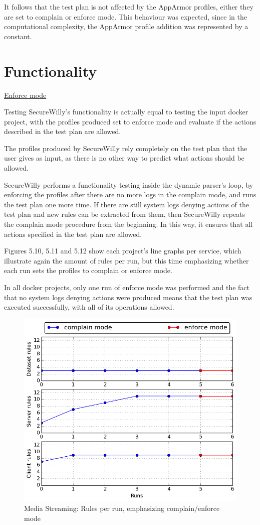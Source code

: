 It follows that the test plan is not affected by the AppArmor profiles, either they are set to complain or enforce mode. This behaviour was expected, since in the computational complexity, the AppArmor profile addition was represented by a constant.

\section{Functionality}
\underline{Enforce mode}
\hfill\break

Testing SecureWilly's functionality is actually equal to testing the input docker project, with the profiles produced set to enforce mode and evaluate if the actions described in the test plan are allowed.

The profiles produced by SecureWilly rely completely on the test plan that the user gives as input, as there is no other way to predict what actions should be allowed.  

SecureWilly performs a functionality testing inside the dynamic parser's loop, by enforcing the profiles after there are no more logs in the complain mode, and runs the test plan one more time. If there are still system logs denying actions of the test plan and new rules can be extracted from them, then SecureWilly repeats the complain mode procedure from the beginning. In this way, it ensures that all actions specified in the test plan are allowed.

Figures 5.10, 5.11 and 5.12 show each project's line graphs per service, which illustrate again the amount of rules per run, but this time emphasizing whether each run sets the profiles to complain or enforce mode.

In all docker projects, only one run of enforce mode was performed and the fact that no system logs denying actions were produced means that the test plan was executed successfully, with all of its operations allowed.

\hfill\break

\begin{figure}[h!]
  \centering
   \includegraphics[width=0.8\linewidth]{figures/mediastreaming/complain_enforce_rules.png}
   \caption{Media Streaming: Rules per run, emphasizing complain/enforce mode}
\end{figure}


